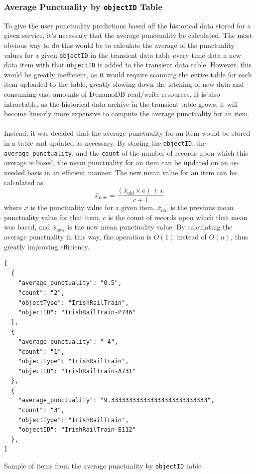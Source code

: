 \documentclass[a4paper,11pt]{report}
\newenvironment{code}{\captionsetup{type=listing}}{}
\begin{document}
\subsubsection{Average Punctuality by \texttt{objectID} Table}
To give the user punctuality predictions based off the historical data stored for a given service, it's necessary that the average punctuality be calculated.
The most obvious way to do this would be to calculate the average of the punctuality values for a given \verb|objectID| in the transient data table every time data a new data item with that \verb|objectID| is added to the transient data table.
However, this would be greatly inefficient, as it would require scanning the entire table for each item uploaded to the table, greatly slowing down the fetching of new data and consuming vast amounts of DynamoDB read/write resources.
It is also intractable, as the historical data archive in the transient table grows, it will become linearly more expensive to compute the average punctuality for an item.
\\\\
Instead, it was decided that the average punctuality for an item would be stored in a table and updated as necessary.
By storing the \verb|objectID|, the \verb|average_punctuality|, and the \verb|count| of the number of records upon which this average is based, the mean punctuality for an item can be updated on an as-needed basis in an efficient manner.
The new mean value for an item can be calculated as:
\[
  \bar{x}_{\text{new}} = \frac{\left( \bar{x}_\text{old} \times c \right) + x}{c+1}
\]
where $x$ is the punctuality value for a given item, $\bar{x}_{\text{old}}$ is the previous mean punctuality value for that item, $c$ is the count of records upon which that mean was based, and $\bar{x}_{\text{new}}$ is the new mean punctuality value.
By calculating the average punctuality in this way, the operation is $O(1)$ instead of $O(n)$, thus greatly improving efficiency. 

\begin{code}
\begin{verbatim}
[
  {
    "average_punctuality": "0.5",
    "count": "2",
    "objectType": "IrishRailTrain",
    "objectID": "IrishRailTrain-P746"
  },
  {
    "average_punctuality": "-4",
    "count": "1",
    "objectType": "IrishRailTrain",
    "objectID": "IrishRailTrain-A731"
  },
  {
    "average_punctuality": "9.333333333333333333333333333",
    "count": "3",
    "objectType": "IrishRailTrain",
    "objectID": "IrishRailTrain-E112"
  },
]
\end{verbatim}
\caption{Sample of items from the average punctuality by \texttt{objectID} table}
\end{code}
\end{document}
